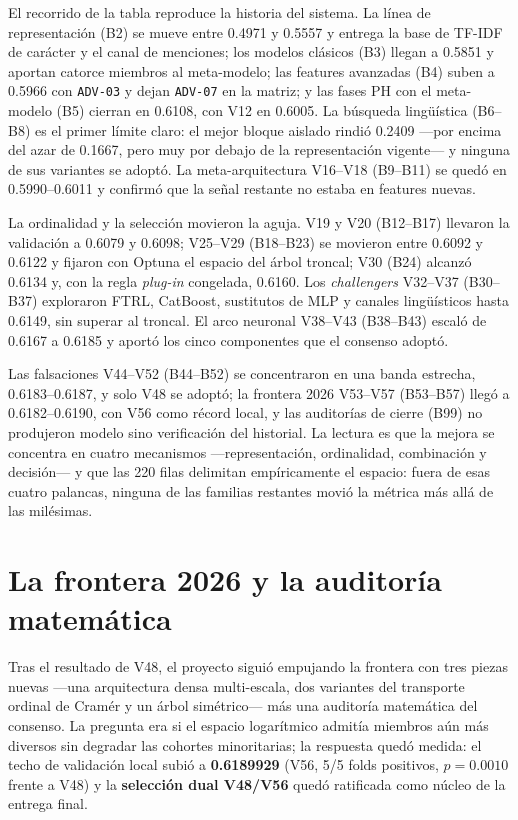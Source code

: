 \documentclass[journal]{IEEEtai}
\begin{document}
El recorrido de la tabla reproduce la historia del sistema. La l\'inea de representaci\'on (B2) se
mueve entre 0.4971 y 0.5557 y entrega la base de TF-IDF de car\'acter y el canal de menciones; los modelos
cl\'asicos (B3) llegan a 0.5851 y aportan catorce miembros al meta-modelo; las features avanzadas
(B4) suben a 0.5966 con \texttt{ADV-03} y dejan \texttt{ADV-07} en la matriz; y las fases PH con
el meta-modelo (B5) cierran en 0.6108, con V12 en 0.6005. La b\'usqueda ling\"u\'istica
(B6--B8) es el primer l\'imite claro: el mejor bloque aislado rindi\'o 0.2409 ---por encima del
azar de 0.1667, pero muy por debajo de la representaci\'on vigente--- y ninguna de sus variantes se
adopt\'o. La meta-arquitectura V16--V18 (B9--B11) se qued\'o en 0.5990--0.6011 y confirm\'o que la
se\~nal restante no estaba en features nuevas.

La ordinalidad y la selecci\'on movieron la aguja. V19 y V20 (B12--B17) llevaron la validaci\'on a
0.6079 y 0.6098; V25--V29 (B18--B23) se movieron entre 0.6092 y 0.6122 y fijaron con Optuna el
espacio del \'arbol troncal; V30 (B24) alcanz\'o 0.6134 y, con la regla \textit{plug-in} congelada,
0.6160. Los \textit{challengers} V32--V37 (B30--B37) exploraron FTRL, CatBoost, sustitutos de MLP
y canales ling\"u\'isticos hasta 0.6149, sin superar al troncal. El arco neuronal V38--V43
(B38--B43) escal\'o de 0.6167 a 0.6185 y aport\'o los cinco componentes que el consenso adopt\'o.

Las falsaciones V44--V52 (B44--B52) se concentraron en una banda estrecha, 0.6183--0.6187, y solo
V48 se adopt\'o; la frontera 2026 V53--V57 (B53--B57) lleg\'o a 0.6182--0.6190, con V56 como
r\'ecord local, y las auditor\'ias de cierre (B99) no produjeron modelo sino verificaci\'on del
historial. La lectura es que la mejora se concentra en cuatro mecanismos ---representaci\'on,
ordinalidad, combinaci\'on y decisi\'on--- y que las 220 filas delimitan emp\'iricamente el espacio:
fuera de esas cuatro palancas, ninguna de las familias restantes movi\'o la m\'etrica m\'as all\'a
de las mil\'esimas.

\section{La frontera 2026 y la auditor\'ia matem\'atica}

Tras el resultado de V48, el proyecto sigui\'o empujando la frontera con tres piezas nuevas ---una arquitectura densa multi-escala, dos variantes del transporte ordinal de Cram\'er y un \'arbol sim\'etrico--- m\'as una auditor\'ia matem\'atica del consenso. La pregunta era si el espacio logar\'itmico admit\'ia miembros a\'un m\'as diversos sin degradar las cohortes minoritarias; la respuesta qued\'o medida: el techo de validaci\'on local subi\'o a \textbf{0.6189929} (V56, 5/5 folds positivos, $p = 0.0010$ frente a V48) y la \textbf{selecci\'on dual V48/V56} qued\'o ratificada como n\'ucleo de la entrega final.
\end{document}
